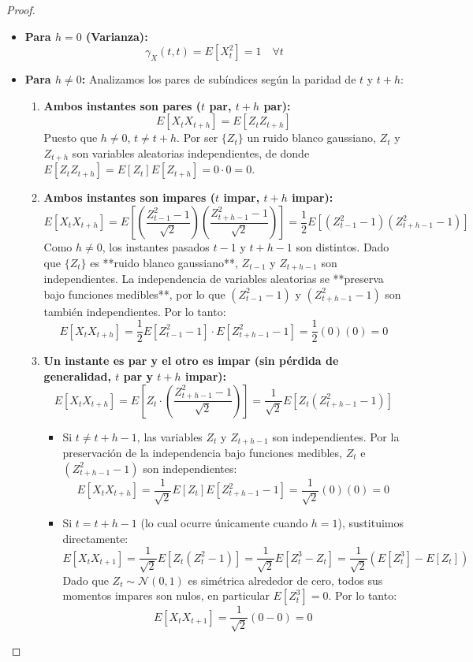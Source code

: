 \documentclass[11pt,letterpaper]{article}
\begin{document}
\begin{proof}
\begin{itemize}
    \item \textbf{Para $h = 0$ (Varianza):}
    \[
    \gamma_X(t, t) = E[X_t^2] = 1 \quad \forall t
    \]

    \item \textbf{Para $h \neq 0$:} Analizamos los pares de subíndices según la paridad de $t$ y $t+h$:
    
    \begin{enumerate}
        \item \textbf{Ambos instantes son pares ($t$ par, $t+h$ par):}
        \[
        E[X_t X_{t+h}] = E[Z_t Z_{t+h}]
        \]
        Puesto que $h \neq 0$, $t \neq t+h$. Por ser $\{Z_t\}$ un ruido blanco gaussiano, $Z_t$ y $Z_{t+h}$ son variables aleatorias independientes, de donde $E[Z_t Z_{t+h}] = E[Z_t]E[Z_{t+h}] = 0 \cdot 0 = 0$.

        \item \textbf{Ambos instantes son impares ($t$ impar, $t+h$ impar):}
        \[
        E[X_t X_{t+h}] = E\left[\left(\frac{Z_{t-1}^2 - 1}{\sqrt{2}}\right)\left(\frac{Z_{t+h-1}^2 - 1}{\sqrt{2}}\right)\right] = \frac{1}{2} E\left[(Z_{t-1}^2 - 1)(Z_{t+h-1}^2 - 1)\right]
        \]
        Como $h \neq 0$, los instantes pasados $t-1$ y $t+h-1$ son distintos. Dado que $\{Z_t\}$ es **ruido blanco gaussiano**, $Z_{t-1}$ y $Z_{t+h-1}$ son independientes. La independencia de variables aleatorias se **preserva bajo funciones medibles**, por lo que $(Z_{t-1}^2 - 1)$ y $(Z_{t+h-1}^2 - 1)$ son también independientes. Por lo tanto:
        \[
        E[X_t X_{t+h}] = \frac{1}{2} E[Z_{t-1}^2 - 1] \cdot E[Z_{t+h-1}^2 - 1] = \frac{1}{2} (0)(0) = 0
        \]

        \item \textbf{Un instante es par y el otro es impar (sin pérdida de generalidad, $t$ par y $t+h$ impar):}
        \[
        E[X_t X_{t+h}] = E\left[Z_t \cdot \left(\frac{Z_{t+h-1}^2 - 1}{\sqrt{2}}\right)\right] = \frac{1}{\sqrt{2}} E\left[Z_t (Z_{t+h-1}^2 - 1)\right]
        \]
        \begin{itemize}
            \item Si $t \neq t+h-1$, las variables $Z_t$ y $Z_{t+h-1}$ son independientes. Por la preservación de la independencia bajo funciones medibles, $Z_t$ e $(Z_{t+h-1}^2 - 1)$ son independientes:
            \[
            E[X_t X_{t+h}] = \frac{1}{\sqrt{2}} E[Z_t] E[Z_{t+h-1}^2 - 1] = \frac{1}{\sqrt{2}} (0)(0) = 0
            \]
            \item Si $t = t+h-1$ (lo cual ocurre únicamente cuando $h = 1$), sustituimos directamente:
            \[
            E[X_t X_{t+1}] = \frac{1}{\sqrt{2}} E\left[Z_t (Z_t^2 - 1)\right] = \frac{1}{\sqrt{2}} E[Z_t^3 - Z_t] = \frac{1}{\sqrt{2}} \left( E[Z_t^3] - E[Z_t] \right)
            \]
            Dado que $Z_t \sim \mathcal{N}(0,1)$ es simétrica alrededor de cero, todos sus momentos impares son nulos, en particular $E[Z_t^3] = 0$. Por lo tanto:
            \[
            E[X_t X_{t+1}] = \frac{1}{\sqrt{2}} (0 - 0) = 0
            \]
        \end{itemize}
    \end{enumerate}
\end{itemize}


\end{proof}
\end{document}
